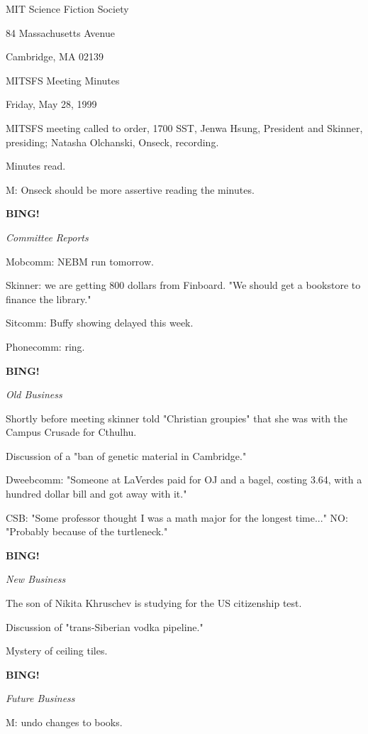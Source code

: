 \documentclass[12pt]{article}
\newcommand{\bing}{{\bf BING!} }
\newcommand{\goto}[1]{\bing \vskip 12pt \centerline{{\em{#1}}}}
\begin{document}
\begin{center}

MIT Science Fiction Society 

84 Massachusetts Avenue

Cambridge, MA 02139

\vspace{12pt}

MITSFS Meeting Minutes 

Friday, May 28, 1999

\end{center}
 
\vspace{18pt}

\setlength{\parskip}{6pt}

\noindent
MITSFS meeting called to order, 1700 SST,
Jenwa Hsung, President and Skinner, presiding; Natasha Olchanski, Onseck, recording.

Minutes read.

M: Onseck should be more assertive reading the minutes.

\goto{Committee Reports}

Mobcomm: NEBM run tomorrow.

Skinner: we are getting 800 dollars from Finboard. "We should get a bookstore to finance the library."

Sitcomm: Buffy showing delayed this week.

Phonecomm: ring.

\goto{Old Business}

Shortly before meeting skinner told "Christian groupies" that she was with the Campus Crusade for Cthulhu.

Discussion of a "ban of genetic material in Cambridge."

Dweebcomm: "Someone at LaVerdes paid for OJ and a bagel, costing 3.64, with a hundred dollar bill and got away with it."

CSB: "Some professor thought I was a math major for the longest time..." NO: "Probably because of the turtleneck."

\goto{New Business}

The son of Nikita Khruschev is studying for the US citizenship test.

Discussion of "trans-Siberian vodka pipeline."

Mystery of ceiling tiles.

\goto{Future Business}

M: undo changes to books.
\end{document}
